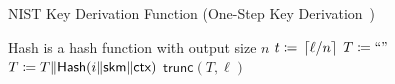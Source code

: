 \begin{algorithm}[t]
\caption{NIST Key Derivation Function
    (One-Step Key Derivation~\cite[Section 4]{NIST-SP-800-56Cr2})}
\label{alg:nist_kdf}
\begin{algorithmic}[1]
\Require \textsf{Hash} is a hash function with output size $n$
    \State $t \coloneqq{} \left\lceil \ell/n \right\rceil$
    \State $T \coloneqq{} \text{``''}$
        \State $T \coloneqq{} T\|\textsf{Hash}(i\|\textsf{skm}\|\textsf{ctx})$
    \EndFor
    \State \Return $\textsf{trunc}(T, \ell)$
\EndProcedure
\end{algorithmic}
\end{algorithm}
